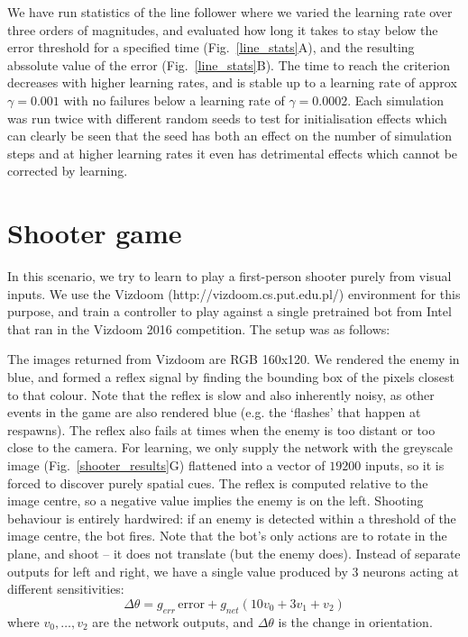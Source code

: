 \documentclass{aamas2018}
\begin{document}
We have run statistics of the line follower where we varied the
learning rate over three orders of magnitudes, and evaluated how long
it takes to stay below the error threshold for a specified time
(Fig.~\ref{line_stats}A), and the resulting abssolute value of the
error (Fig.~\ref{line_stats}B). The time to reach the criterion
decreases with higher learning rates, and is stable up to a learning
rate of approx $\gamma = 0.001$ with no failures below a learning rate of
$\gamma = 0.0002$. Each simulation was run twice with different random seeds to
test for initialisation effects which can clearly be seen that
the seed has both an effect on the number of simulation steps
and at higher learning rates it even has detrimental effects which
cannot be corrected by learning.




\section{Shooter game}
In this scenario, we try to learn to play a first-person shooter
purely from visual inputs. We use the Vizdoom
(http://vizdoom.cs.put.edu.pl/) environment for this purpose, and
train a controller to play against a single pretrained bot from Intel
that ran in the Vizdoom 2016 competition. The setup was as follows:

The images returned from Vizdoom are RGB 160x120. We rendered the
enemy in blue, and formed a reflex signal by finding the bounding box
of the pixels closest to that colour. Note that the reflex is slow and
also inherently noisy, as other events in the game are also rendered
blue (e.g. the ‘flashes’ that happen at respawns). The reflex also
fails at times when the enemy is too distant or too close to the
camera. For learning, we only supply the network with the greyscale
image (Fig.~\ref{shooter_results}G) flattened into a vector of $19200$
inputs, so it is forced to discover purely spatial cues. The reflex is
computed relative to the image centre, so a negative value implies the
enemy is on the left. Shooting behaviour is entirely hardwired: if an
enemy is detected within a threshold of the image centre, the bot
fires. Note that the bot's only actions are to rotate in the plane,
and shoot -- it does not translate (but the enemy does). Instead of
separate outputs for left and right, we have a single value produced
by 3 neurons acting at different sensitivities:
\begin{equation}
\Delta \theta = g_{err}\, \mathrm{error} + g_{net} \left( 10 v_0 + 3 v_1 + v_2 \right)
\end{equation}
where $v_0, \ldots, v_2$ are the network outputs, and $\Delta \theta$
is the change in orientation.
\end{document}
